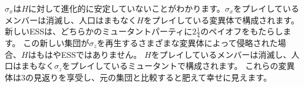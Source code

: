 $\sigma_x$は$H$に対して進化的に安定していないことがわかります。$\sigma_x$をプレイしているメンバーは消滅し、人口はまもなく$H$をプレイしている変異体で構成されます。
新しいESSは、どちらかのミュータントパーティに$2 \frac{1}{4}$のペイオフをもたらします。
この新しい集団が$\sigma_z$を再生するさまざまな変異体によって侵略された場合、$H$はもはやESSではありません。
$H$をプレイしているメンバーは消滅し、人口はまもなく$\sigma_z$をプレイしているミュータントで構成されます。
これらの変異体は3の見返りを享受し、元の集団と比較すると肥えて幸せに見えます。

